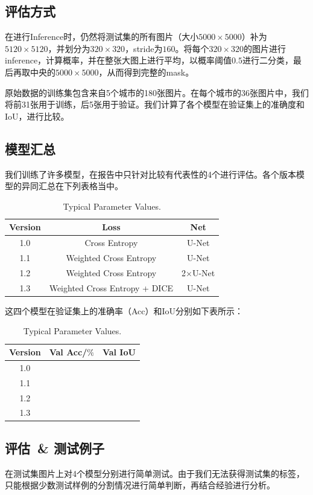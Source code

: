 \documentclass[a4paper,12pt]{article}
\begin{document}
\begin{CJK*}{UTF8}{gbsn}
\begin{spacing}{1.2}
    \subsection{评估方式}
    在进行Inference时，仍然将测试集的所有图片（大小$5000\times5000$）补为$5120\times5120$，并划分为$320\times320$，stride为$160$。将每个$320\times320$的图片进行inference，计算概率，并在整张大图上进行平均，以概率阈值$0.5$进行二分类，最后再取中央的$5000\times5000$，从而得到完整的mask。
    
    原始数据的训练集包含来自5个城市的180张图片。在每个城市的36张图片中，我们将前31张用于训练，后5张用于验证。我们计算了各个模型在验证集上的准确度和IoU，进行比较。
    \subsection{模型汇总}
    我们训练了许多模型，在报告中只针对比较有代表性的4个进行评估。各个版本模型的异同汇总在下列表格当中。
    \begin{table}[!]
    \caption{Typical Parameter Values.}
    \label{tab:parameters}
    \centering
    \begin{tabular}{ccc}
	\hline
	\hline
	Version & Loss & Net \\
	\hline
	1.0 & Cross Entropy & U-Net \\
	1.1 & Weighted Cross Entropy & U-Net \\
	1.2 & Weighted Cross Entropy & 2$\times$U-Net \\
	1.3 & Weighted Cross Entropy + DICE & U-Net \\
	\hline
	\hline
    \end{tabular}
    \end{table}
    这四个模型在验证集上的准确率（Acc）和IoU分别如下表所示：
    \begin{table}[!]
    \caption{Typical Parameter Values.}
    \label{tab:parameters}
    \centering
    \begin{tabular}{ccc}
	\hline
	\hline
	Version & Val Acc/$\%$ & Val IoU \\
	\hline
	1.0 & &  \\
	1.1 & &  \\
	1.2 & &  \\
	1.3 & &  \\
	\hline
	\hline
    \end{tabular}
    \end{table}
    \subsection{评估~\& 测试例子}
    在测试集图片上对4个模型分别进行简单测试。由于我们无法获得测试集的标签，只能根据少数测试样例的分割情况进行简单判断，再结合经验进行分析。
    

\end{spacing}
\end{CJK*}
\end{document}
